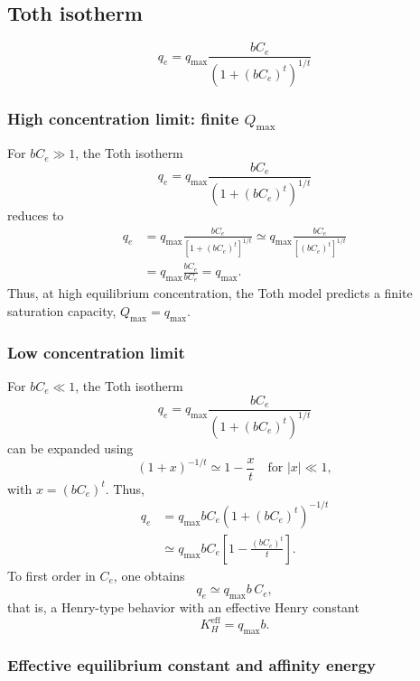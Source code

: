 \documentclass[12pt]{article}
\begin{document}
	
	\subsection{Toth isotherm}
	\[
	q_e = q_{\max} \frac{b C_e}{\left(1 + (b C_e)^{t}\right)^{1/t}}
	\]
	
	\subsubsection{High concentration limit: finite $Q_{\max}$}
	
	For $b C_e \gg 1$, the Toth isotherm
	\[
	q_e = q_{\max} \frac{b C_e}{\left(1 + (b C_e)^{t}\right)^{1/t}}
	\]
	reduces to
	\begin{align}
		q_e 
		&= q_{\max} \frac{b C_e}{\left[1 + (b C_e)^{t}\right]^{1/t}}
		\simeq q_{\max} \frac{b C_e}{\left[(b C_e)^{t}\right]^{1/t}} \nonumber \\
		&= q_{\max} \frac{b C_e}{b C_e}
		= q_{\max}.
	\end{align}
	Thus, at high equilibrium concentration, the Toth model predicts a finite saturation capacity, $Q_{\max} = q_{\max}$.
	
	\subsubsection{Low concentration limit}
	
	For $b C_e \ll 1$, the Toth isotherm
	\[
	q_e = q_{\max} \frac{b C_e}{\left(1 + (b C_e)^{t}\right)^{1/t}}
	\]
	can be expanded using
	\[
	\left(1 + x\right)^{-1/t} \simeq 1 - \frac{x}{t} \quad \text{for } |x| \ll 1,
	\]
	with $x = (b C_e)^{t}$. Thus,
	\begin{align}
		q_e
		&= q_{\max} b C_e \left(1 + (b C_e)^{t}\right)^{-1/t} \nonumber \\
		&\simeq q_{\max} b C_e \left[1 - \frac{(b C_e)^{t}}{t}\right].
	\end{align}
	To first order in $C_e$, one obtains
	\begin{equation}
		q_e \simeq q_{\max} b\, C_e,
	\end{equation}
	that is, a Henry-type behavior with an effective Henry constant
	\begin{equation}
		K_H^{\mathrm{eff}} = q_{\max} b.
	\end{equation}

	\subsubsection{Effective equilibrium constant and affinity energy}
\end{document}
